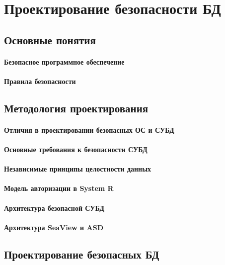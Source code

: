 \section{Проектирование безопасности БД}

\subsection{Основные понятия}

\paragraph{Безопасное программное обеспечение}
\paragraph{Правила безопасности}

\subsection{Методология проектирования}
\paragraph{Отличия в проектировании безопасных ОС и СУБД}
\paragraph{Основные требования к безопасности СУБД}
\paragraph{Независимые принципы целостности данных}
\paragraph{Модель авторизации в System R}
\paragraph{Архитектура безопасной СУБД} 
\paragraph{Архитектура SeaView и ASD} 

\subsection{Проектирование безопасных БД}
